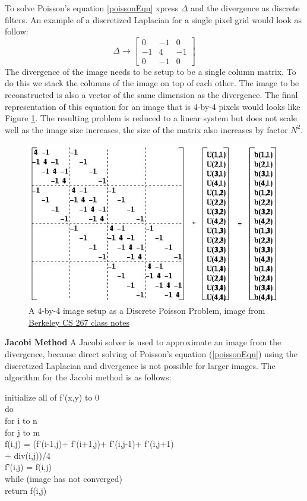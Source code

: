 \documentclass[10pt,twopage]{acmsiggraph}
\begin{document}
To solve Poisson's equation \ref{poissonEqn} xpress \ensuremath{\Delta} and the divergence as discrete filters. An example of a discretized Laplacian for a single pixel grid would look as follow:
\begin{equation}
\label{lapDes}
\Delta \rightarrow  
\left[\begin{array}{ccc}
0 & -1 & 0 \\
-1 & 4 & -1 \\
0 & -1 & 0 \end{array}\right]
\end{equation}
The divergence of the image needs to be setup to be a single column matrix. To do this we stack the columns of the image on top of each other. The image to be reconstructed is also a vector of the same dimension as the divergence. The final representation of this equation for an image that is 4-by-4 pixels would looks like Figure \ref{poissonGrid}. The resulting problem is reduced to a linear system but does not scale well as the image size increases, the size of the matrix also increases by factor $N^2$. 

\begin{figure}%
\centering
\includegraphics[width=.44\textwidth]{fig/matrix.jpg}
\caption{A 4-by-4 image setup as a Discrete Poisson Problem, image from \href{http://www.cs.berkeley.edu/~demmel/cs267/lecture24/lecture24.html}{Berkeley CS 267 class notes} }
\label{poissonGrid}
\end{figure}


{\bf Jacobi Method}
A Jacobi solver is used to approximate an image from the divergence, because direct solving of Poisson's equation (\ref{poissonEqn}) using the discretized Laplacian and divergence is not possible for larger images. The algorithm for the Jacobi method is as follows:

\begin{tabbing}
initialize all of f'(x,y) to 0\\
do \= \\
\> for i to n \= \\
\>\> for j to m\=\\
\>  \> f(i,j) = (f'(i-1,j)+ f'(i+1,j)+ f'(i,j-1)+ f'(i,j+1)\\
\> \>      \>       + div(i,j))/4 \\
f'(i,j) = f(i,j)\\
while (image has not converged) \\
return f(i,j)
\end{tabbing}
\end{document}
